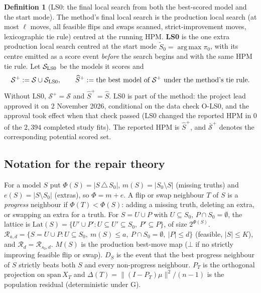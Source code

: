 \documentclass[11pt]{article}
\theoremstyle{definition}
\newtheorem{definition}{Definition}
\theoremstyle{remark}
\newcommand{\Sz}{S_0}
\newcommand{\Sh}{\widehat S}
\newcommand{\Spl}{\widehat S^{+}}
\newcommand{\cS}{\mathcal S}
\newcommand{\cR}{\mathcal R}
\newcommand{\Lat}{\mathrm{Lat}}
\DeclareMathOperator*{\argmax}{arg\,max}
\begin{document}
\begin{definition}[LS0: the final local search from both the best-scored model and the start mode]\label{def:ls0}
The method's final local search is the production local search (at most $\ell$ moves, all feasible flips and swaps
scanned, strict-improvement moves, lexicographic tie rule) centred at the running HPM. \textbf{LS0} is the one extra
production local search centred at the start mode $\tilde S_0=\argmax\pi_0$, with its centre emitted as a score
event \emph{before} the search begins and with the same HPM tie rule. Let $\cS_{\rm LS0}$ be the models it scores and
\[
\cS^{+}:=\cS\cup\cS_{\rm LS0},\qquad \Spl:=\text{the best model of }\cS^{+}\text{ under the method's tie rule}.
\]
Without LS0, $\cS^+=\cS$ and $\Spl=\Sh$. LS0 is part of the method: the project lead approved it on 2 November 2026,
conditional on the data check O-LS0, and the approval took effect when that check passed (LS0 changed the reported HPM in
$0$ of the $2{,}394$ completed study fits). The reported HPM is $\Spl$, and $\bar{\cS}^+$ denotes the corresponding
potential scored set.
\end{definition}

\subsection{Notation for the repair theory}

For a model $S$ put $\Phi(S)=|S\,\triangle\,\Sz|$, $m(S)=|\Sz\setminus S|$ (missing truths) and $e(S)=|S\setminus\Sz|$
(extras), so $\Phi=m+e$. A flip or swap neighbour $T$ of $S$ is a \emph{progress} neighbour if $\Phi(T)<\Phi(S)$:
adding a missing truth, deleting an extra, or swapping an extra for a truth. For $S=U\cup P$ with $U\subseteq\Sz$,
$P\cap\Sz=\emptyset$, the lattice is $\Lat(S)=\{U'\cup P':U\subseteq U'\subseteq\Sz,\ P'\subseteq P\}$, of size $2^{\Phi(S)}$.
$\cR_{a,d}=\{S=U\cup P:U\subseteq\Sz,\ m(S)\le a,\ P\cap\Sz=\emptyset,\ |P|\le d\}$ (feasible, $|S|\le K$), and
$\cR_d=\cR_{s_0,d}$. $M(S)$ is the production best-move map ($\bot$ if no strictly improving feasible flip or swap).
$D_S$ is the event that the best progress neighbour of $S$ strictly beats both $S$ and every non-progress neighbour.
$P_T$ is the orthogonal projection on $\mathrm{span}\,X_T$ and $\Delta(T)=\|(I-P_T)\mu\|^2/(n-1)$ is the
population residual (deterministic under G).
\end{document}
